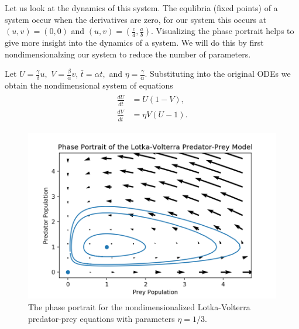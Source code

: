 Let us look at the dynamics of this system. The equlibria (fixed points) of a system occur when the derivatives are zero, for our system this occurs at $(u,v)=(0,0)$ and $(u,v)=(\frac{c}{d},\frac{a}{b})$.
Visualizing the phase portrait helps to give more insight into the dynamics of a system. We will do this by first nondimensionalzing our system to reduce the number of parameters.

Let $U = \frac{\gamma}{\delta}u,$ $V = \frac{\beta}{\alpha}v$, $\bar{t} = \alpha t,$ and $\eta = \frac{\gamma}{\alpha}$.
Substituting into the original ODEs we obtain the nondimensional system of equations
\begin{align}
	\begin{split}
	\frac{dU}{d\bar{t}} &= U(1-V),\\
	\frac{dV}{d\bar{t}} &= \eta V (U-1).
	\end{split}\label{lotka_volterra}
\end{align}
\begin{figure}
\centering
\includegraphics[width=\textwidth]{figures/LV_Phase_Portrait.png}
\caption{The phase portrait for the nondimensionalized Lotka-Volterra predator-prey equations with parameters $\eta = 1/3$.
 }
\label{fig: lotka-phase}
\end{figure}


